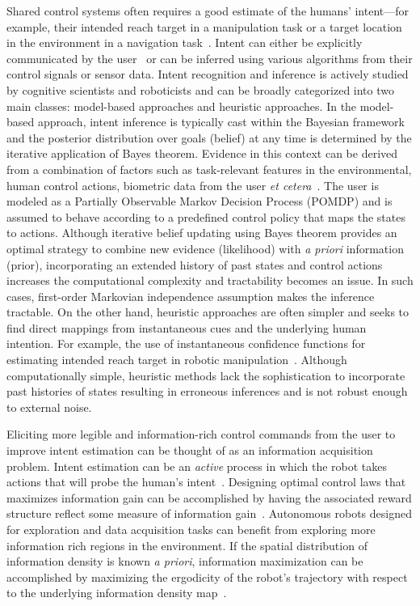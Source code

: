 Shared control systems often requires a good estimate of the humans' intent---for example, their intended reach target in a manipulation task or a target location in the environment in a navigation task~\cite{liu2016goal}. Intent can either be explicitly communicated by the user~\cite{choi2008laser} or can be inferred using various algorithms from their control signals or sensor data. Intent recognition and inference is actively studied by cognitive scientists and roboticists and can be broadly categorized into two main classes: model-based approaches and heuristic approaches. In the model-based approach, intent inference is typically cast within the Bayesian framework and the posterior distribution over goals (belief) at any time is determined by the iterative application of Bayes theorem. Evidence in this context can be derived from a combination of factors such as task-relevant features in the environmental, human control actions, biometric data from the user \textit{et cetera}~\cite{baker2007goal, baker2009action}. The user is modeled as a Partially Observable Markov Decision Process (POMDP) and is assumed to behave according to a predefined control policy that maps the states to actions. Although iterative belief updating using Bayes theorem provides an optimal strategy to combine new evidence (likelihood) with \textit{a priori} information (prior), incorporating an extended history of past states and control actions increases the computational complexity and tractability becomes an issue. In such cases,  first-order Markovian independence assumption makes the inference tractable. On the other hand, heuristic approaches are often simpler and seeks to find direct mappings from instantaneous cues and the underlying human intention. For example, the use of instantaneous confidence functions for estimating intended reach target in robotic manipulation~\cite{dragan2012assistive, gopinath2017human}. Although computationally simple, heuristic methods lack the sophistication to incorporate past histories of states resulting in erroneous inferences and is not robust enough to external noise. 

Eliciting more legible and information-rich control commands from the user to improve intent estimation can be thought of as an information acquisition problem. Intent estimation can be an \textit{active} process in which the robot takes actions that will probe the human's intent~\cite{sadigh2016information, sadigh2016planning}. Designing optimal control laws that maximizes information gain can be accomplished by having the associated reward structure reflect some measure of information gain~\cite{atanasov2014information}. 
Autonomous robots designed for exploration and data acquisition tasks can benefit from exploring more information rich regions in the environment. If the spatial distribution of information density is known \textit{a priori}, information maximization can be accomplished by maximizing the ergodicity of the robot's trajectory with respect to the underlying information density map~\cite{miller2016ergodic, miller2013trajectory}. 


